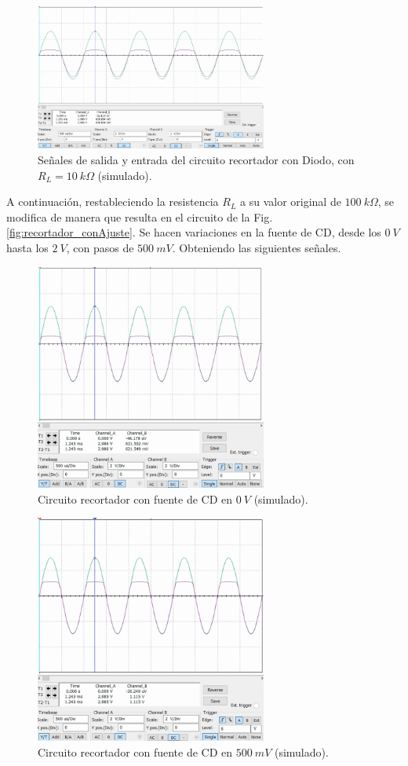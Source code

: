 \documentclass[journal]{IEEEtran}
\begin{document}
\begin{figure}[H]
        \centering
        \includegraphics[width=3in]{SignalSimulated_04.png}
        \caption{Señales de salida y entrada del circuito recortador con Diodo, con $R_L=10~k\Omega$ (simulado).}
        \label{fig:SignalSimulated_04}
\end{figure}

A continuación, restableciendo la resistencia $R_L$ a su valor original de $100~k\Omega$, se modifica de manera que resulta en el circuito de la Fig. \ref{fig:recortador_conAjuste}.
Se hacen variaciones en la fuente de CD, desde los $0~V$ hasta los $2~V$, con pasos de $500~mV$. Obteniendo las siguientes señales.

\begin{figure}[H]
        \centering
        \includegraphics[width=3in]{SignalSimulated_05.png}
        \caption{Circuito recortador con fuente de CD en $0~V$ (simulado).}
        \label{fig:SignalSimulated_05}
\end{figure}

\begin{figure}[H]
        \centering
        \includegraphics[width=3in]{SignalSimulated_06.png}
        \caption{Circuito recortador con fuente de CD en $500~mV$ (simulado).}
        \label{fig:SignalSimulated_06}
\end{figure}
\end{document}
